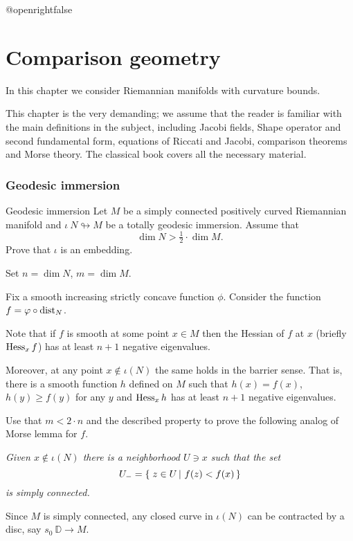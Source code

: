 \csname @openrightfalse\endcsname
\chapter{Comparison geometry}

In this chapter we consider Riemannian manifolds with curvature bounds.

This chapter is the very demanding;
we assume that the reader is familiar with the 
main definitions in the subject,
including Jacobi fields, 
Shape operator and second fundamental form, 
equations of Riccati and Jacobi,
comparison theorems and Morse theory.
The classical book \cite{cheeger-ebin} covers all the  necessary  material.

\subsection*{Geodesic immersion\hard}

\begin{pr}{\hard}{Geodesic immersion}
\label{Geodesic immersion}
Let $M$ be a simply connected positively curved Riemannian manifold and $\iota\:N\looparrowright M$ be a totally geodesic immersion.
Assume that 
\[\dim N>\tfrac 12\cdot \dim M.\]
Prove that $\iota$ is an embedding.
\end{pr}

Set $n=\dim N$, $m=\dim M$.

Fix a smooth increasing strictly concave function $\phi$.
Consider the function $f=\varphi\circ\operatorname{\rm dist}_N$.

Note that if $f$ is smooth at some point $x\in M$ 
then the Hessian of $f$ at $x$ (briefly $\operatorname{\rm Hess}\nolimits_xf$)
has at least $n+1$ negative eigenvalues.

Moreover, at any point $x\notin \iota(N)$ the same holds in the barrier sense.
That is, there is a smooth function $h$ defined on $M$
such that $h(x)=f(x)$, $h(y)\ge f(y)$ for any $y$
and $\operatorname{\rm Hess}\nolimits_xh$ has at least $n+1$ negative eigenvalues.

Use that $m< 2\cdot n$ and the described property to prove the following
analog of Morse lemma for $f$.

{\it Given $x\notin \iota(N)$ there is a neighborhood $U\ni x$ such that the set 
\[U_-=\set{z\in U}{f(z)<f(x)}\] is simply connected.}

\medskip

Since $M$ is simply connected,
any closed curve in $\iota(N)$
can be contracted by a disc, say $s_0\:\mathbb D\to M$.

